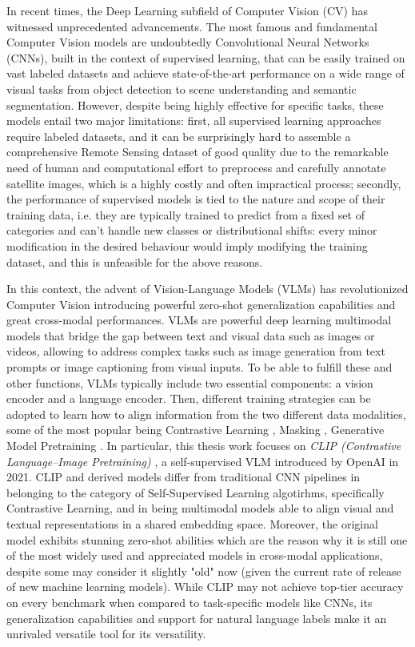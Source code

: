 \documentclass[a4paper, oneside, english]{sapthesis} %
\begin{document}
In recent times, the Deep Learning subfield of Computer Vision (CV) has witnessed unprecedented advancements. The most famous and fundamental Computer Vision models are undoubtedly Convolutional Neural Networks (CNNs), built in the context of supervised learning, that can be easily trained on vast labeled datasets and achieve state-of-the-art performance on a wide range of visual tasks from object detection to scene understanding and semantic segmentation. However, despite being highly effective for specific tasks, these models entail two major limitations: first, all supervised learning approaches require labeled datasets, and it can be surprisingly hard to assemble a comprehensive Remote Sensing dataset of good quality due to the remarkable need of human and computational effort to preprocess and carefully annotate satellite images, which is a highly costly and often impractical process; secondly, the performance of supervised models is tied to the nature and scope of their training data, i.e. they are typically trained to predict from a fixed set of categories and can't handle new classes or distributional shifts: every minor modification in the desired behaviour would imply modifying the training dataset, and this is unfeasible for the above reasons.

In this context, the advent of Vision-Language Models (VLMs) has revolutionized Computer Vision \cite{marimo2025beyond} introducing powerful zero-shot generalization capabilities and great cross-modal performances. VLMs are powerful deep learning multimodal models that bridge the gap between text and visual data such as images or videos, allowing to address complex tasks such as image generation from text prompts or image captioning from visual inputs. To be able to fulfill these and other functions, VLMs typically include two essential components: a vision encoder and a language encoder. Then, different training strategies can be adopted to learn how to align information from the two different data modalities, some of the most popular being Contrastive Learning \cite{radford2021learning} \cite{chen2020simple} \cite{he2020momentum} \cite{jia2021scaling}, Masking \cite{singh2022flava}, Generative Model Pretraining \cite{ramesh2022hierarchical} \cite{rombach2022high} \cite{saharia2022photorealistic} \cite{alayrac2022flamingo}. In particular, this thesis work focuses on \emph{CLIP (Contrastive Language–Image Pretraining)} \cite{radford2021learning}, a self-supervised VLM introduced by OpenAI in 2021. CLIP and derived models differ from traditional CNN pipelines in belonging to the category of Self-Supervised Learning algotirhms, specifically Contrastive Learning, and in being multimodal models able to align visual and textual representations in a shared embedding space. Moreover, the original model exhibits stunning zero-shot abilities which are the reason why it is still one of the most widely used and appreciated models in cross-modal applications, despite some may consider it slightly "old" now (given the current rate of release of new machine learning models). While CLIP may not achieve top-tier accuracy on every benchmark when compared to task-specific models like CNNs, its generalization capabilities and support for natural language labels make it an unrivaled versatile tool for its versatility.
\end{document}

